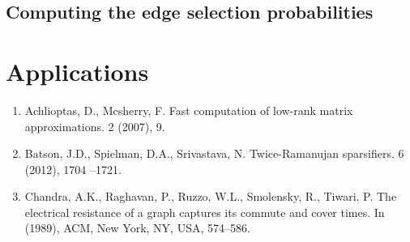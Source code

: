 \documentclass{article}
\begin{document}
\subsection{Computing the edge selection probabilities}

\section{Applications}




\begin{enumerate}[1.]
    \item Achlioptas, D., Mcsherry, F. Fast computation of low-rank matrix
        approximations. 2 (2007), 9.

    \item Batson, J.D., Spielman, D.A., Srivastava, N.  Twice-Ramanujan
        sparsifiers. 6 (2012), 1704 –1721.

    \item Chandra, A.K., Raghavan, P., Ruzzo, W.L., Smolensky, R., Tiwari,
        P.  The electrical resistance of a graph captures its commute and
        cover times. In (1989), ACM, New York, NY, USA, 574–586.
\end{enumerate}
\end{document}
